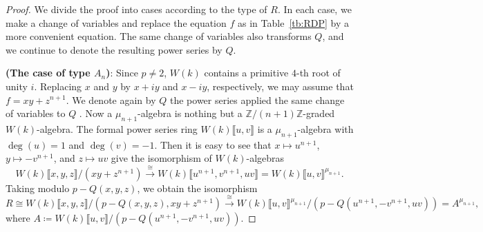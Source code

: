 \documentclass[uplatex,11pt,a4paper]{amsart} %
\numberwithin{equation}{section}
\numberwithin{figure}{section}
\numberwithin{table}{section}
\theoremstyle{plain}
\theoremstyle{definition}
\newcommand{\xr}{\xrightarrow}
\newcommand{\Z}{\mathbb{Z}}
\begin{document}
\begin{proof}
We divide the proof into cases according to the type of $R$. In each case, we make a change of variables and replace the equation $f$ as in Table~\ref{tb:RDP} by a more convenient equation. The same change of variables also transforms $Q$, and we continue to denote the resulting power series by $Q$.

\textbf{(The case of type $A_n$)}: Since $p\neq 2$, $W(k)$ contains a primitive $4$-th root of unity $i$. Replacing $x$ and $y$ by $x+iy$ and $x-iy$, respectively, we may assume that $f=xy+z^{n+1}$. We denote again by $Q$ the power series applied the same change of variables to $Q$ .
Now a $\mu_{n+1}$-algebra is nothing but a $\Z/(n+1)\Z$-graded $W(k)$-algebra. The formal power series ring $W(k)\llbracket u,v\rrbracket$ is a $\mu_{n+1}$-algebra with $\deg(u)=1$ and $\deg(v)=-1$. Then it is easy to see that $x\mapsto u^{n+1}$, $y\mapsto -v^{n+1}$, and $z\mapsto uv$ give the isomorphism of $W(k)$-algebras
\[
W(k)\llbracket x,y,z\rrbracket/(xy+z^{n+1}) \xr{\cong} W(k)\llbracket u^{n+1},v^{n+1},uv\rrbracket = W(k)\llbracket u,v\rrbracket^{\mu_{n+1}}.
\]
Taking modulo $p-Q(x,y,z)$, we obtain the isomorphism
\[
R\cong W(k)\llbracket x,y,z\rrbracket/(p-Q(x,y,z),xy+z^{n+1}) \xr{\cong} W(k)\llbracket u,v\rrbracket^{\mu_{n+1}}/(p-Q(u^{n+1},-v^{n+1},uv))=A^{\mu_{n+1}},
\]
where $A\coloneqq W(k)\llbracket u,v\rrbracket/(p-Q(u^{n+1},-v^{n+1},uv))$.


\end{proof}
\end{document}
